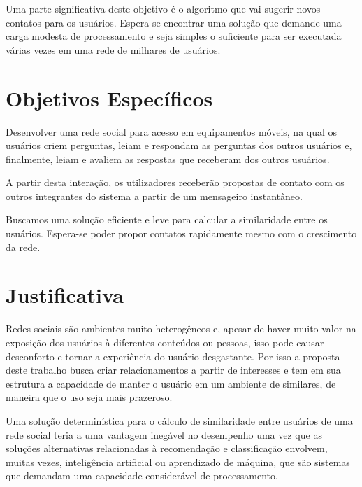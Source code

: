 Uma parte significativa deste objetivo é o algoritmo que vai sugerir novos contatos para os usuários. Espera-se encontrar uma solução que demande uma carga modesta de processamento e seja simples o suficiente para ser executada várias vezes em uma rede de milhares de usuários.

\section{Objetivos Específicos}

Desenvolver uma rede social para acesso em equipamentos móveis, na qual os usuários criem perguntas, leiam e respondam as perguntas dos outros usuários e, finalmente, leiam e avaliem as respostas que receberam dos outros usuários.

A partir desta interação, os utilizadores receberão propostas de contato com os outros integrantes do sistema a partir de um mensageiro instantâneo.

Buscamos uma solução eficiente e leve para calcular a similaridade entre os usuários. Espera-se poder propor contatos rapidamente mesmo com o crescimento da rede.


\section{Justificativa}

Redes sociais são ambientes muito heterogêneos e, apesar de haver muito valor na exposição dos usuários à diferentes conteúdos ou pessoas, isso pode causar desconforto e tornar a experiência do usuário desgastante. Por isso a proposta deste trabalho busca criar relacionamentos a partir de interesses e tem em sua estrutura a capacidade de manter o usuário em um ambiente de similares, de maneira que o uso seja mais prazeroso.


Uma solução determinística para o cálculo de similaridade entre usuários de uma rede social teria a uma vantagem inegável no desempenho uma vez que as soluções alternativas relacionadas à recomendação e classificação envolvem, muitas vezes, inteligência artificial ou aprendizado de máquina, que são sistemas que demandam uma capacidade considerável de processamento.

